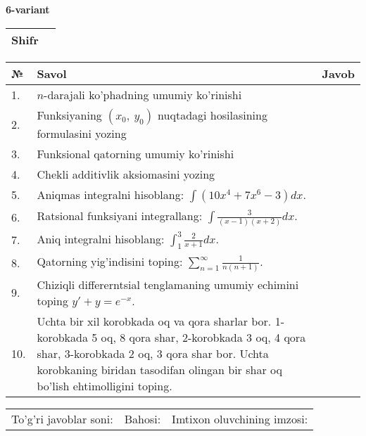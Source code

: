 \documentclass{article}
\begin{document}
  \egroup
  
  \newpage
  
  
  \textbf{6-variant}\\
  
  \bgroup
  \def\arraystretch{1.6} %
  
  \begin{tabular}{|m{5.7cm}|m{9.5cm}|}
  \hline
  Shifr & \\
  \hline
  \end{tabular}
  
  \vspace{1cm}
  
  \begin{tabular}{|m{0.7cm}|m{10cm}|m{4cm}|}
  \hline
  № & Savol & Javob \\
  \hline
  1. & \(n\)-darajali ko'phadning umumiy ko'rinishi &  \\
  \hline
  2. & Funksiyaning \((x_{0},\ y_{0})\) nuqtadagi hosilasining formulasini yozing &  \\
  \hline
  3. & Funksional qatorning umumiy ko'rinishi &  \\
  \hline
  4. & Chekli additivlik aksiomasini yozing &  \\
  \hline
  5. & Aniqmas integralni hisoblang: \(\int {\left( 10x^{4} + 7x^{6} - 3 \right)dx}\). &  \\
  \hline
  6. & Ratsional funksiyani integrallang: \(\int {\frac{3}{(x - 1)(x + 2)}dx}\). &  \\
  \hline
  7. & Aniq integralni hisoblang: \(\int_{1}^{3}\frac{2}{x + 1}dx\). &  \\
  \hline
  8. & Qatorning yig'indisini toping: \(\sum_{n = 1}^{\infty}\frac{1}{n(n + 1)}\). &  \\
  \hline
  9. & Chiziqli differerntsial tenglamaning umumiy echimini toping \(y' + y = e^{- x}\). &  \\
  \hline
  10. & Uchta bir xil korobkada oq va qora sharlar bor. 1-korobkada 5 oq, 8 qora shar, 2-korobkada 3 oq, 4 qora shar, 3-korobkada 2 oq, 3 qora shar bor. Uchta korobkaning biridan tasodifan olingan bir shar oq bo'lish ehtimolligini toping. &  \\
  \hline
  \end{tabular}
  
  \vspace{1cm}
  
  \begin{tabular}{lll}
  To'g'ri javoblar soni: \underline{\hspace{1.5cm}} & 
  Bahosi: \underline{\hspace{1.5cm}} & 
  Imtixon oluvchining imzosi: \underline{\hspace{2cm}} \\
  \end{tabular}
  
\end{document}

